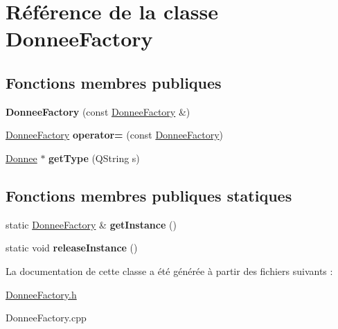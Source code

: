 \hypertarget{class_donnee_factory}{\section{Référence de la classe Donnee\-Factory}
\label{class_donnee_factory}
}
\subsection*{Fonctions membres publiques}
\begin{DoxyCompactItemize}
\item 
\hypertarget{class_donnee_factory_aadb96794ca512ddb0fb19cc6ec747d7d}{{\bfseries Donnee\-Factory} (const \hyperlink{class_donnee_factory}{Donnee\-Factory} \&)}\label{class_donnee_factory_aadb96794ca512ddb0fb19cc6ec747d7d}

\item 
\hypertarget{class_donnee_factory_ad81f816bad62673a96905a14559f2776}{\hyperlink{class_donnee_factory}{Donnee\-Factory} {\bfseries operator=} (const \hyperlink{class_donnee_factory}{Donnee\-Factory})}\label{class_donnee_factory_ad81f816bad62673a96905a14559f2776}

\item 
\hypertarget{class_donnee_factory_abfa87825644e669fb1cf0fdf7b0bef1b}{\hyperlink{class_donnee}{Donnee} $\ast$ {\bfseries get\-Type} (Q\-String s)}\label{class_donnee_factory_abfa87825644e669fb1cf0fdf7b0bef1b}

\end{DoxyCompactItemize}
\subsection*{Fonctions membres publiques statiques}
\begin{DoxyCompactItemize}
\item 
\hypertarget{class_donnee_factory_ae0f49fbb82efdc19494391ea372b84ef}{static \hyperlink{class_donnee_factory}{Donnee\-Factory} \& {\bfseries get\-Instance} ()}\label{class_donnee_factory_ae0f49fbb82efdc19494391ea372b84ef}

\item 
\hypertarget{class_donnee_factory_a06d6c7248fce77e49e07a5c97a459ca7}{static void {\bfseries release\-Instance} ()}\label{class_donnee_factory_a06d6c7248fce77e49e07a5c97a459ca7}

\end{DoxyCompactItemize}


La documentation de cette classe a été générée à partir des fichiers suivants \-:\begin{DoxyCompactItemize}
\item 
\hyperlink{_donnee_factory_8h}{Donnee\-Factory.\-h}\item 
Donnee\-Factory.\-cpp\end{DoxyCompactItemize}
